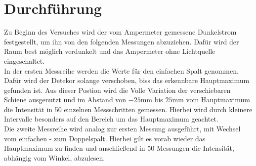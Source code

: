 \section{Durchführung}
Zu Beginn des Versuches wird der vom Ampermeter gemessene Dunkelstrom festgestellt, um ihn von den folgenden Messungen abzuziehen.
Dafür wird der Raum best möglich verdunkelt und das Ampermeter ohne Lichtquelle eingeschaltet.
\\ 
\newline
In der ersten Messreihe werden die Werte für den einfachen Spalt genommen. Dafür wird der Detekor solange verschoben, biss das erkennbare Hauptmaximum 
gefunden ist. Aus dieser Postion wird die Volle Variation der verschiebaren Schiene ausgenutzt und im Abstand von $-25 \si{\mm}$ bis 
$25 \si{\mm}$ vom Hauptmaximum die Intensität in 50 einzelnen Messschritten gemessen. 
Hierbei wird durch kleinere Intervalle besonders auf den Bereich um das Hauptmaximum geachtet.
\\
\newline
Die zweite Messreihe wird analog zur ersten Messung ausgeführt, mit Wechsel vom einfachen - zum Doppelspalt.
Hierbei gilt es vorab wieder das Hauptmaximum zu finden und anschließend in 50 Messungen die Intensität, abhängig vom Winkel,
abzulesen. 